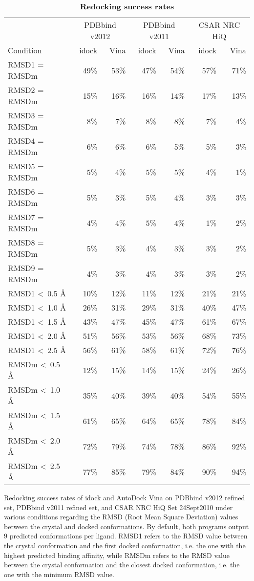 \documentclass[10pt]{article}
\begin{document}
\begin{table}[!ht]
\caption{
\bf{Redocking success rates}}
\begin{tabular}{lrrrrrr}
\hline
& \multicolumn{2}{c}{PDBbind v2012} & \multicolumn{2}{c}{PDBbind v2011} & \multicolumn{2}{c}{CSAR NRC HiQ}\\
Condition & idock & Vina & idock & Vina & idock & Vina\\
\hline
RMSD1 = RMSDm & 49\% & 53\% & 47\% & 54\% & 57\% & 71\%\\
RMSD2 = RMSDm & 15\% & 16\% & 16\% & 14\% & 17\% & 13\%\\
RMSD3 = RMSDm &  8\% &  7\% &  8\% &  8\% &  7\% &  4\%\\
RMSD4 = RMSDm &  6\% &  6\% &  6\% &  5\% &  5\% &  3\%\\
RMSD5 = RMSDm &  5\% &  4\% &  5\% &  5\% &  4\% &  1\%\\
RMSD6 = RMSDm &  5\% &  3\% &  5\% &  4\% &  3\% &  3\%\\
RMSD7 = RMSDm &  4\% &  4\% &  5\% &  4\% &  1\% &  2\%\\
RMSD8 = RMSDm &  5\% &  3\% &  4\% &  3\% &  3\% &  2\%\\
RMSD9 = RMSDm &  4\% &  3\% &  4\% &  3\% &  3\% &  2\%\\
\noalign{\smallskip}
RMSD1 \textless\ 0.5 \AA & 10\% & 12\% & 11\% & 12\% & 21\% & 21\%\\
RMSD1 \textless\ 1.0 \AA & 26\% & 31\% & 29\% & 31\% & 40\% & 47\%\\
RMSD1 \textless\ 1.5 \AA & 43\% & 47\% & 45\% & 47\% & 61\% & 67\%\\
RMSD1 \textless\ 2.0 \AA & 51\% & 56\% & 53\% & 56\% & 68\% & 73\%\\
RMSD1 \textless\ 2.5 \AA & 56\% & 61\% & 58\% & 61\% & 72\% & 76\%\\
\noalign{\smallskip}
RMSDm \textless\ 0.5 \AA & 12\% & 15\% & 14\% & 15\% & 24\% & 26\%\\
RMSDm \textless\ 1.0 \AA & 35\% & 40\% & 39\% & 40\% & 54\% & 55\%\\
RMSDm \textless\ 1.5 \AA & 61\% & 65\% & 64\% & 65\% & 78\% & 84\%\\
RMSDm \textless\ 2.0 \AA & 72\% & 79\% & 74\% & 78\% & 86\% & 92\%\\
RMSDm \textless\ 2.5 \AA & 77\% & 85\% & 79\% & 84\% & 90\% & 94\%\\
\end{tabular}
\begin{flushleft}\label{SuccessRate} Redocking success rates of idock and AutoDock Vina on PDBbind v2012 refined set, PDBbind v2011 refined set, and CSAR NRC HiQ Set 24Sept2010 under various conditions regarding the RMSD (Root Mean Square Deviation) values between the crystal and docked conformations. By default, both programs output 9 predicted conformations per ligand. RMSD1 refers to the RMSD value between the crystal conformation and the first docked conformation, i.e. the one with the highest predicted binding affinity, while RMSDm refers to the RMSD value between the crystal conformation and the closest docked conformation, i.e. the one with the minimum RMSD value.
\end{flushleft}
\label{tab:label}
\end{table}
\end{document}
